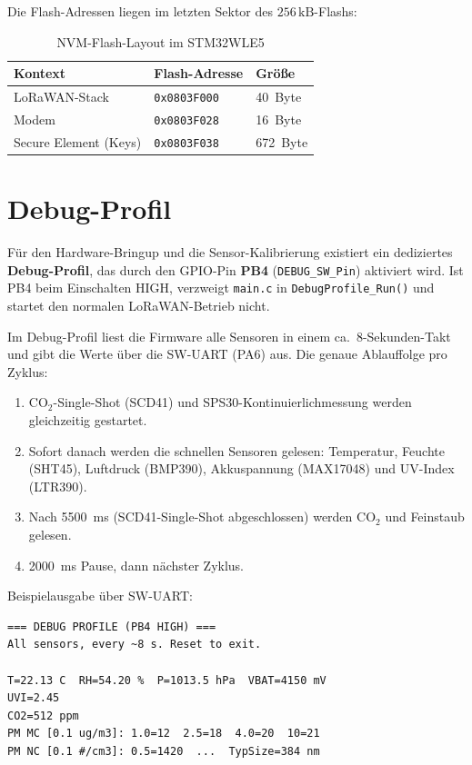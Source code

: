 Die Flash-Adressen liegen im letzten Sektor des $256\,\text{kB}$-Flashs:

\begin{table}[H]
  \centering
  \begin{tabular}{lll}
    \hline
    \textbf{Kontext} & \textbf{Flash-Adresse} & \textbf{Größe} \\
    \hline
    LoRaWAN-Stack & \texttt{0x0803F000} & 40~Byte \\
    Modem         & \texttt{0x0803F028} & 16~Byte \\
    Secure Element (Keys) & \texttt{0x0803F038} & 672~Byte \\
    \hline
  \end{tabular}
  \caption{NVM-Flash-Layout im STM32WLE5}
  \label{tab:nvm}
\end{table}

\section*{Debug-Profil}

Für den Hardware-Bringup und die Sensor-Kalibrierung existiert ein dediziertes \textbf{Debug-Profil}, das durch den GPIO-Pin \textbf{PB4} (\texttt{DEBUG\_SW\_Pin}) aktiviert wird. Ist PB4 beim Einschalten HIGH, verzweigt \texttt{main.c} in \texttt{DebugProfile\_Run()} und startet den normalen LoRaWAN-Betrieb nicht.

Im Debug-Profil liest die Firmware alle Sensoren in einem ca.\ 8-Sekunden-Takt und gibt die Werte über die SW-UART (PA6) aus. Die genaue Ablauffolge pro Zyklus:

\begin{enumerate}
  \item CO${}_2$-Single-Shot (SCD41) und SPS30-Kontinuierlichmessung werden gleichzeitig gestartet.
  \item Sofort danach werden die schnellen Sensoren gelesen: Temperatur, Feuchte (SHT45), Luftdruck (BMP390), Akkuspannung (MAX17048) und UV-Index (LTR390).
  \item Nach 5500~ms (SCD41-Single-Shot abgeschlossen) werden CO${}_2$ und Feinstaub gelesen.
  \item 2000~ms Pause, dann nächster Zyklus.
\end{enumerate}

Beispielausgabe über SW-UART:
\begin{verbatim}
=== DEBUG PROFILE (PB4 HIGH) ===
All sensors, every ~8 s. Reset to exit.

T=22.13 C  RH=54.20 %  P=1013.5 hPa  VBAT=4150 mV
UVI=2.45
CO2=512 ppm
PM MC [0.1 ug/m3]: 1.0=12  2.5=18  4.0=20  10=21
PM NC [0.1 #/cm3]: 0.5=1420  ...  TypSize=384 nm
\end{verbatim}

